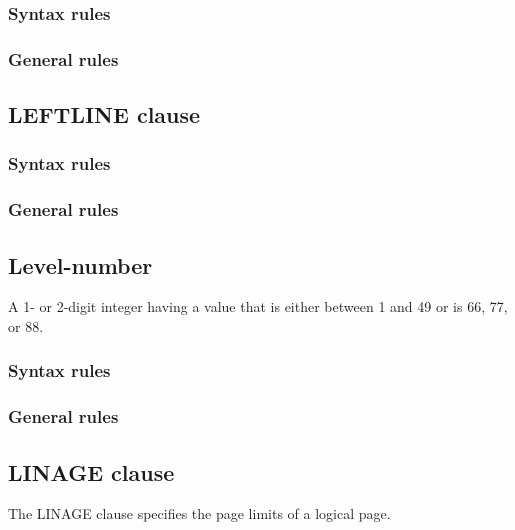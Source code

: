 \subsubsection{Syntax rules}

\subsubsection{General rules}

\subsection{LEFTLINE clause}

\begin{syntax}[\miscextcolour]
\end{syntax}

\subsubsection{Syntax rules}

\subsubsection{General rules}

\subsection{Level-number}

A 1- or 2-digit integer having a value that is either between 1 and 49 or is 66, 77,  or 88.

\subsubsection{Syntax rules}

\subsubsection{General rules}

\subsection{LINAGE clause}

The LINAGE clause specifies the page limits of a logical page.

